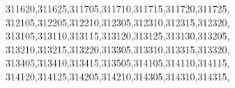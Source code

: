 \documentclass[
  12,
  dvipsnames]{article}
\newenvironment{Shaded}{\begin{snugshade}}{\end{snugshade}}
\newcommand{\NormalTok}[1]{#1}
\newcommand{\StringTok}[1]{\textcolor[rgb]{0.31,0.60,0.02}{#1}}
\begin{document}
\begin{Shaded}
\begin{Highlighting}[]
                  \StringTok{\textquotesingle{}311620\textquotesingle{}}\NormalTok{,}\StringTok{\textquotesingle{}311625\textquotesingle{}}\NormalTok{,}\StringTok{\textquotesingle{}311705\textquotesingle{}}\NormalTok{,}\StringTok{\textquotesingle{}311710\textquotesingle{}}\NormalTok{,}\StringTok{\textquotesingle{}311715\textquotesingle{}}\NormalTok{,}\StringTok{\textquotesingle{}311720\textquotesingle{}}\NormalTok{,}\StringTok{\textquotesingle{}311725\textquotesingle{}}\NormalTok{,}
                  \StringTok{\textquotesingle{}312105\textquotesingle{}}\NormalTok{,}\StringTok{\textquotesingle{}312205\textquotesingle{}}\NormalTok{,}\StringTok{\textquotesingle{}312210\textquotesingle{}}\NormalTok{,}\StringTok{\textquotesingle{}312305\textquotesingle{}}\NormalTok{,}\StringTok{\textquotesingle{}312310\textquotesingle{}}\NormalTok{,}\StringTok{\textquotesingle{}312315\textquotesingle{}}\NormalTok{,}\StringTok{\textquotesingle{}312320\textquotesingle{}}\NormalTok{,}
                  \StringTok{\textquotesingle{}313105\textquotesingle{}}\NormalTok{,}\StringTok{\textquotesingle{}313110\textquotesingle{}}\NormalTok{,}\StringTok{\textquotesingle{}313115\textquotesingle{}}\NormalTok{,}\StringTok{\textquotesingle{}313120\textquotesingle{}}\NormalTok{,}\StringTok{\textquotesingle{}313125\textquotesingle{}}\NormalTok{,}\StringTok{\textquotesingle{}313130\textquotesingle{}}\NormalTok{,}\StringTok{\textquotesingle{}313205\textquotesingle{}}\NormalTok{,}
                  \StringTok{\textquotesingle{}313210\textquotesingle{}}\NormalTok{,}\StringTok{\textquotesingle{}313215\textquotesingle{}}\NormalTok{,}\StringTok{\textquotesingle{}313220\textquotesingle{}}\NormalTok{,}\StringTok{\textquotesingle{}313305\textquotesingle{}}\NormalTok{,}\StringTok{\textquotesingle{}313310\textquotesingle{}}\NormalTok{,}\StringTok{\textquotesingle{}313315\textquotesingle{}}\NormalTok{,}\StringTok{\textquotesingle{}313320\textquotesingle{}}\NormalTok{,}
                  \StringTok{\textquotesingle{}313405\textquotesingle{}}\NormalTok{,}\StringTok{\textquotesingle{}313410\textquotesingle{}}\NormalTok{,}\StringTok{\textquotesingle{}313415\textquotesingle{}}\NormalTok{,}\StringTok{\textquotesingle{}313505\textquotesingle{}}\NormalTok{,}\StringTok{\textquotesingle{}314105\textquotesingle{}}\NormalTok{,}\StringTok{\textquotesingle{}314110\textquotesingle{}}\NormalTok{,}\StringTok{\textquotesingle{}314115\textquotesingle{}}\NormalTok{,}
                  \StringTok{\textquotesingle{}314120\textquotesingle{}}\NormalTok{,}\StringTok{\textquotesingle{}314125\textquotesingle{}}\NormalTok{,}\StringTok{\textquotesingle{}314205\textquotesingle{}}\NormalTok{,}\StringTok{\textquotesingle{}314210\textquotesingle{}}\NormalTok{,}\StringTok{\textquotesingle{}314305\textquotesingle{}}\NormalTok{,}\StringTok{\textquotesingle{}314310\textquotesingle{}}\NormalTok{,}\StringTok{\textquotesingle{}314315\textquotesingle{}}\NormalTok{,}

\end{Highlighting}
\end{Shaded}
\end{document}
